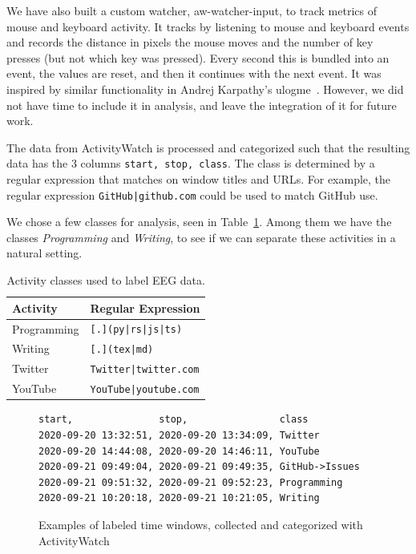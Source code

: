         We have also built a custom watcher, aw-watcher-input\label{section:aw-watcher-input}, to track metrics of mouse and keyboard activity. It tracks by listening to mouse and keyboard events and records the distance in pixels the mouse moves and the number of key presses (but not which key was pressed). Every second this is bundled into an event, the values are reset, and then it continues with the next event. It was inspired by similar functionality in Andrej Karpathy's ulogme~\cite{karpathy_ulogme_2016}. However, we did not have time to include it in analysis, and leave the integration of it for future work.


        The data from ActivityWatch is processed and categorized such that the resulting data has the 3 columns \texttt{start, stop, class}. The class is determined by a regular expression that matches on window titles and URLs. For example, the regular expression \texttt{GitHub|github.com} could be used to match GitHub use.

We chose a few classes for analysis, seen in Table~\ref{table:activity-classes}. Among them we have the classes \emph{Programming} and \emph{Writing}, to see if we can separate these activities in a natural setting.

\begin{table}[h]
    \centering
    \begin{tabular}{ll}
        \toprule
        \textbf{Activity} & \textbf{Regular Expression} \\
        \midrule
        Programming & \texttt{[.](py|rs|js|ts)} \\
        Writing & \texttt{[.](tex|md)} \\
        Twitter & \texttt{Twitter|twitter.com} \\
        YouTube & \texttt{YouTube|youtube.com} \\
        \bottomrule
    \end{tabular}
    \caption{Activity classes used to label EEG data.}\label{table:activity-classes}
\end{table}

\begin{figure}[h]
\begin{verbatim}
start,               stop,                class
2020-09-20 13:32:51, 2020-09-20 13:34:09, Twitter
2020-09-20 14:44:08, 2020-09-20 14:46:11, YouTube
2020-09-21 09:49:04, 2020-09-21 09:49:35, GitHub->Issues
2020-09-21 09:51:32, 2020-09-21 09:52:23, Programming
2020-09-21 10:20:18, 2020-09-21 10:21:05, Writing
\end{verbatim}
    \caption{Examples of labeled time windows, collected and categorized with ActivityWatch}\label{code:class-csv}
\end{figure}

